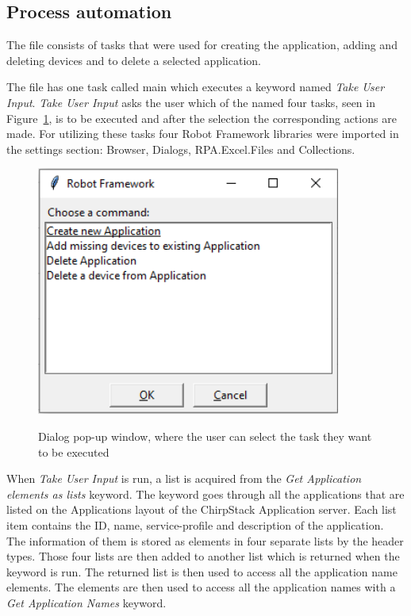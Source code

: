 \subsection{Process automation}
The  file consists of tasks that were used for creating the application, adding and deleting devices and to delete a selected application.

The file has one task called main which executes a keyword named \textit{Take User Input}.
\textit{Take User Input} asks the user which of the named four tasks, seen in Figure~\ref{fig:user_input_commands}, is to be executed and after the selection the corresponding actions are made.
For utilizing these tasks four Robot Framework libraries were imported in the settings section: Browser, Dialogs, RPA.Excel.Files and Collections.

\clearpage

\begin{figure}[ht]
  \centering
  {\includegraphics[width=10cm]{illustration/take_user_input_dialog.PNG}}
  \caption{Dialog pop-up window, where the user can select the task they want to be executed}
  \label{fig:user_input_commands}
\end{figure}

When \textit{Take User Input} is run, a list is acquired from the \textit{Get Application elements as lists} keyword.
The keyword goes through all the applications that are listed on the Applications layout of the ChirpStack Application server.
Each list item contains the ID, name, service-profile and description of the application.
The information of them is stored as elements in four separate lists by the header types.
Those four lists are then added to another list which is returned when the keyword is run.
The returned list is then used to access all the application name elements.
The elements are then used to access all the application names with a \textit{Get Application Names} keyword.

